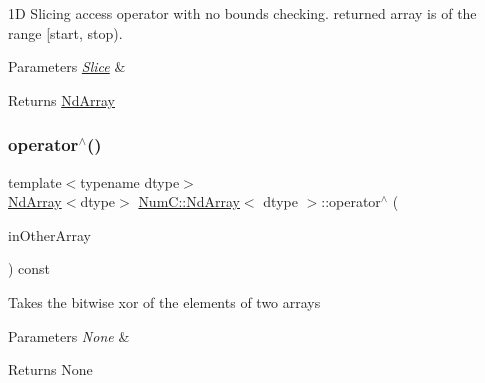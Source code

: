1D Slicing access operator with no bounds checking. returned array is of the range \mbox{[}start, stop).


\begin{DoxyParams}{Parameters}
{\em \mbox{\hyperlink{class_num_c_1_1_slice}{Slice}}} & \\
\hline
\end{DoxyParams}
\begin{DoxyReturn}{Returns}
\mbox{\hyperlink{class_num_c_1_1_nd_array}{Nd\+Array}} 
\end{DoxyReturn}
\mbox{\label{class_num_c_1_1_nd_array_a86e0b03b3047d52c129587a755836bb5}} 
\subsubsection{\texorpdfstring{operator$^\wedge$()}{operator^()}\hspace{0.1cm}{\footnotesize\ttfamily [1/2]}}
{\footnotesize\ttfamily template$<$typename dtype$>$ \\
\mbox{\hyperlink{class_num_c_1_1_nd_array}{Nd\+Array}}$<$dtype$>$ \mbox{\hyperlink{class_num_c_1_1_nd_array}{Num\+C\+::\+Nd\+Array}}$<$ dtype $>$\+::operator$^\wedge$ (\begin{DoxyParamCaption}\item[{const \mbox{\hyperlink{class_num_c_1_1_nd_array}{Nd\+Array}}$<$ dtype $>$ \&}]{in\+Other\+Array }\end{DoxyParamCaption}) const\hspace{0.3cm}{\ttfamily [inline]}}

Takes the bitwise xor of the elements of two arrays


\begin{DoxyParams}{Parameters}
{\em None} & \\
\hline
\end{DoxyParams}
\begin{DoxyReturn}{Returns}
None 
\end{DoxyReturn}
\mbox{\label{class_num_c_1_1_nd_array_a46351f19fb411acd32a90e105e7a0670}} 
